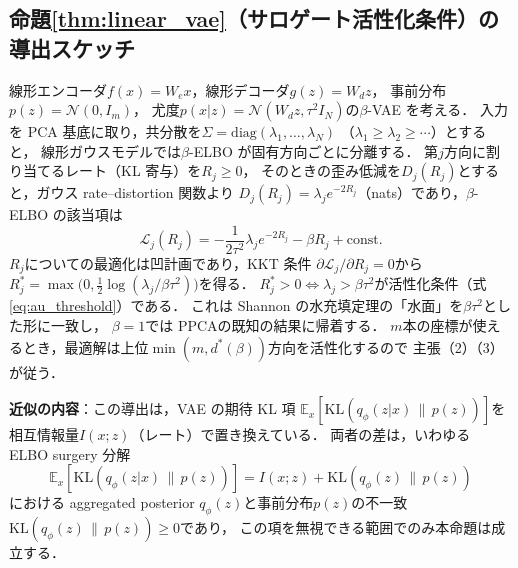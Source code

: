 \documentclass[11pt,a4paper]{jsarticle}
\newcommand{\dstar}{d^{*}(\beta)}
\begin{document}
\subsection{命題\ref{thm:linear_vae}（サロゲート活性化条件）の導出スケッチ}

線形エンコーダ$f(x) = W_e x$，線形デコーダ$g(z) = W_d z$，
事前分布$p(z) = \mathcal{N}(0, I_m)$，
尤度$p(x|z) = \mathcal{N}(W_d z, \tau^2 I_N)$の$\beta$-VAE を考える．
入力を PCA 基底に取り，共分散を$\Sigma = \mathrm{diag}(\lambda_1, \ldots, \lambda_N)$
（$\lambda_1 \geq \lambda_2 \geq \cdots$）とすると，
線形ガウスモデルでは$\beta$-ELBO が固有方向ごとに分離する．
第$j$方向に割り当てるレート（KL 寄与）を$R_j \geq 0$，
そのときの歪み低減を$D_j(R_j)$とすると，ガウス rate--distortion 関数より
$D_j(R_j) = \lambda_j e^{-2R_j}$（nats）であり，$\beta$-ELBO の該当項は
\begin{equation}
  \mathcal{L}_j(R_j) = -\frac{1}{2\tau^2}\lambda_j e^{-2R_j} - \beta R_j + \text{const.}
\end{equation}
$R_j$についての最適化は凹計画であり，KKT 条件
$\partial \mathcal{L}_j / \partial R_j = 0$から
$R_j^* = \max\bigl(0, \tfrac{1}{2}\log(\lambda_j / \beta\tau^2)\bigr)$を得る．
$R_j^* > 0 \iff \lambda_j > \beta\tau^2$が活性化条件（式\eqref{eq:au_threshold}）である．
これは Shannon の水充填定理\cite{cover2006elements}の「水面」を$\beta\tau^2$とした形に一致し，
$\beta = 1$では PPCA\cite{tippingbishop1999ppca}の既知の結果に帰着する．
$m$本の座標が使えるとき，最適解は上位$\min(m, \dstar)$方向を活性化するので
主張（2）（3）が従う．

\textbf{近似の内容}：この導出は，VAE の期待 KL 項
$\mathbb{E}_x[\mathrm{KL}(q_\phi(z|x)\,\|\,p(z))]$を
相互情報量$I(x; z)$（レート）で置き換えている．
両者の差は，いわゆる ELBO surgery 分解\cite{hoffman2016elbo}
\begin{equation}
  \mathbb{E}_x[\mathrm{KL}(q_\phi(z|x)\,\|\,p(z))]
  = I(x; z) + \mathrm{KL}(q_\phi(z)\,\|\,p(z))
  \label{eq:elbo_surgery}
\end{equation}
における aggregated posterior $q_\phi(z)$と事前分布$p(z)$の不一致
$\mathrm{KL}(q_\phi(z)\,\|\,p(z)) \geq 0$であり，
この項を無視できる範囲でのみ本命題は成立する．
\end{document}
